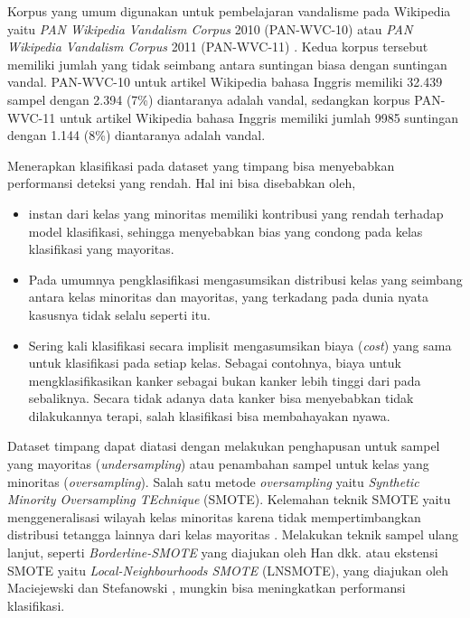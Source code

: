 Korpus yang umum digunakan untuk pembelajaran vandalisme pada Wikipedia yaitu
\textit{PAN Wikipedia Vandalism Corpus} 2010 (PAN-WVC-10)
\cite{potthast:2010b}
atau
\textit{PAN Wikipedia Vandalism Corpus} 2011 (PAN-WVC-11)
\cite{potthast:2010b}.
Kedua korpus tersebut memiliki jumlah yang tidak seimbang antara suntingan
biasa dengan suntingan vandal.
PAN-WVC-10 untuk artikel Wikipedia bahasa Inggris memiliki 32.439 sampel dengan
2.394 (7\%) diantaranya adalah vandal, sedangkan korpus PAN-WVC-11 untuk
artikel Wikipedia bahasa Inggris memiliki jumlah 9985 suntingan dengan 1.144
(8\%) diantaranya adalah vandal.

\newpage
Menerapkan klasifikasi pada dataset yang timpang bisa menyebabkan performansi
deteksi yang rendah.
Hal ini bisa disebabkan oleh,
\begin{itemize}
	\item instan dari kelas yang minoritas memiliki kontribusi yang rendah
	terhadap model klasifikasi, sehingga menyebabkan bias yang condong pada
	kelas klasifikasi yang mayoritas.
	\item Pada umumnya pengklasifikasi mengasumsikan distribusi kelas yang
	seimbang antara kelas minoritas dan mayoritas, yang terkadang pada
	dunia nyata kasusnya tidak selalu seperti itu.
	\item Sering kali klasifikasi secara implisit mengasumsikan biaya
	(\textit{cost}) yang sama untuk klasifikasi pada setiap kelas.
	Sebagai contohnya, biaya untuk mengklasifikasikan kanker sebagai bukan
	kanker lebih tinggi dari pada sebaliknya.
	Secara tidak adanya data kanker bisa menyebabkan tidak dilakukannya
	terapi, salah klasifikasi bisa membahayakan nyawa.
\end{itemize}

Dataset timpang dapat diatasi dengan melakukan penghapusan untuk sampel yang
mayoritas (\textit{undersampling}) atau penambahan sampel untuk kelas
yang minoritas (\textit{oversampling}).
Salah satu metode \textit{oversampling} yaitu \textit{Synthetic Minority
Oversampling TEchnique} (SMOTE).
Kelemahan teknik SMOTE yaitu menggeneralisasi wilayah kelas
minoritas karena tidak mempertimbangkan distribusi tetangga lainnya dari
kelas mayoritas
\cite{maciejewski2011local}.
Melakukan teknik sampel ulang lanjut, seperti
\textit{Borderline-SMOTE}
yang diajukan oleh Han dkk.
\cite{han2005borderline}
atau ekstensi SMOTE yaitu \textit{Local-Neighbourhoods SMOTE} (LNSMOTE), yang
diajukan oleh Maciejewski dan Stefanowski
\cite{maciejewski2011local},
mungkin bisa meningkatkan performansi klasifikasi.

